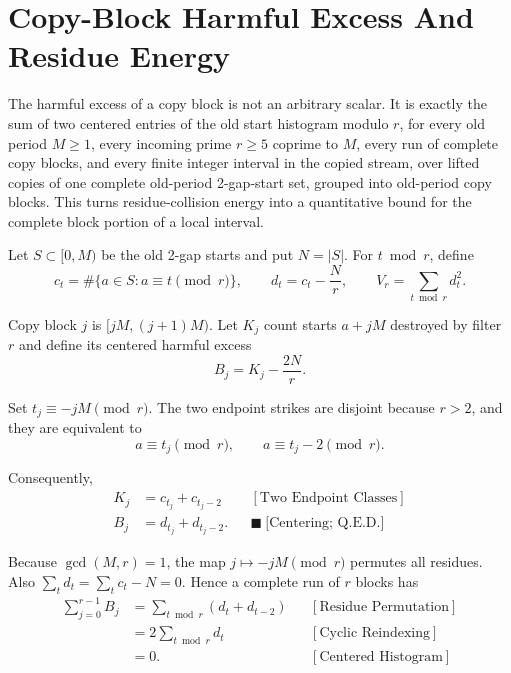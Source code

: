 \section{Copy-Block Harmful Excess And Residue Energy}
\label{sec:copy-block-harmful-excess}

The harmful excess of a copy block is not an arbitrary scalar. It is exactly
the sum of two centered entries of the old start histogram modulo $r$, for
every old period $M\ge1$, every incoming prime $r\ge5$ coprime to $M$, every
run of complete copy blocks, and every finite integer interval in the copied
stream, over lifted copies of one complete old-period 2-gap-start set,
grouped into old-period copy blocks. This turns residue-collision energy into
a quantitative bound for the complete block portion of a local interval.

Let $S\subset[0,M)$ be the old 2-gap starts and put $N=|S|$. For
$t\bmod r$, define
\begin{equation*}
c_t=\#\{a\in S:a\equiv t\pmod r\},
\qquad
d_t=c_t-\frac Nr,
\qquad
V_r=\sum_{t\bmod r}d_t^2.
\end{equation*}

Copy block $j$ is $[jM,(j+1)M)$. Let $K_j$ count starts $a+jM$ destroyed by
filter $r$ and define its centered harmful excess
\begin{equation*}
B_j=K_j-\frac{2N}{r}.
\end{equation*}

Set $t_j\equiv-jM\pmod r$. The two endpoint strikes are disjoint because
$r>2$, and they are equivalent to
\begin{equation*}
a\equiv t_j\pmod r,
\qquad
a\equiv t_j-2\pmod r.
\end{equation*}

Consequently,
\begin{equation*}
\begin{aligned}
K_j
&=c_{t_j}+c_{t_j-2}
&&[\text{Two Endpoint Classes}]\\
B_j
&=d_{t_j}+d_{t_j-2}.
&&\blacksquare\ \text{[Centering; Q.E.D.]}
\end{aligned}
\end{equation*}

Because $\gcd(M,r)=1$, the map $j\mapsto-jM\pmod r$ permutes all residues.
Also $\sum_td_t=\sum_tc_t-N=0$. Hence a complete run of $r$ blocks has
\begin{equation*}
\begin{aligned}
\sum_{j=0}^{r-1}B_j
&=\sum_{t\bmod r}(d_t+d_{t-2})
&&[\text{Residue Permutation}]\\
&=2\sum_{t\bmod r}d_t
&&[\text{Cyclic Reindexing}]\\
&=0.
&&[\text{Centered Histogram}]
\end{aligned}
\end{equation*}

